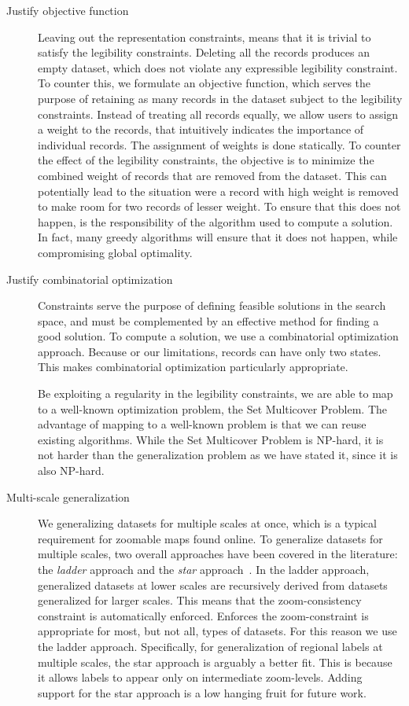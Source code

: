 \documentclass[11pt, oneside]{article}   	%
\begin{document}
\begin{description}
\item[Justify objective function] Leaving out the representation constraints, means that it is trivial to satisfy the legibility constraints. Deleting all the records produces an empty dataset, which does not violate any expressible legibility constraint. To counter this, we formulate an objective function, which serves the purpose of retaining as many records in the dataset subject to the legibility constraints. Instead of treating all records equally, we allow users to assign a weight to the records, that intuitively indicates the importance of individual records. The assignment of weights is done statically. To counter the effect of the legibility constraints, the objective is to minimize the combined weight of records that are removed from the dataset. This can potentially lead to the situation were a record with high weight is removed to make room for two records of lesser weight. To ensure that this does not happen, is the responsibility of the algorithm used to compute a solution. In fact, many greedy algorithms will ensure that it does not happen, while compromising global optimality.

\item[Justify combinatorial optimization]
Constraints serve the purpose of defining feasible solutions in the search space, and must be complemented by an effective method for finding a good solution. To compute a solution, we use a combinatorial optimization approach. Because or our limitations, records can have only two states. This makes combinatorial optimization particularly appropriate.

Be exploiting a regularity in the legibility constraints, we are able to map to a well-known optimization problem, the Set Multicover Problem. The advantage of mapping to a well-known problem is that we can reuse existing algorithms. While the Set Multicover Problem is NP-hard, it is not harder than the generalization problem as we have stated it, since it is also NP-hard.

\item[Multi-scale generalization] We generalizing datasets for multiple scales at once, which is a typical requirement for zoomable maps found online. To generalize datasets for multiple scales, two overall approaches have been covered in the literature: the \emph{ladder} approach and the \emph{star} approach~\cite{foerster2010challenges}. In the ladder approach, generalized datasets at lower scales are recursively derived from datasets generalized for larger scales. This means that the zoom-consistency constraint is automatically enforced. Enforces the zoom-constraint is appropriate for most, but not all, types of datasets. For this reason we use the ladder approach. Specifically, for generalization of regional labels at multiple scales, the star approach is arguably a better fit. This is because it allows labels to appear only on intermediate zoom-levels. Adding support for the star approach is a low hanging fruit for future work.  
\end{description}
\end{document}
